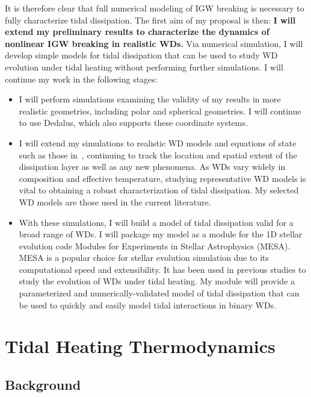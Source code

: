 \documentclass[12pt,
        usenames, %
        dvipsnames %
    ]{article}
\begin{document}
It is therefore clear that full numerical modeling of IGW breaking is necessary
to fully characterize tidal dissipation. The first aim of my proposal is then:
\textbf{I will extend my preliminary results to characterize the dynamics of
nonlinear IGW breaking in realistic WDs.} Via numerical simulation, I will
develop simple models for tidal dissipation that can be used to study WD
evolution under tidal heating without performing further simulations. I will
continue my work in the following stages:
\begin{itemize}
    \item I will perform simulations examining the validity of my results in
        more realistic geometries, including polar and spherical geometries. I
        will continue to use Dedalus, which also supports these coordinate
        systems.

    \item I will extend my simulations to realistic WD models and equations of
        state such as those in~\cite{brassard1992}, continuing to track the
        location and spatial extent of the dissipation layer as well as any new
        phenomena. As WDs vary widely in composition and effective temperature,
        studying representative WD models is vital to obtaining a robust
        characterization of tidal dissipation. My selected WD models are those
        used in the current literature\cite{fullerII, fullerIV}.

    \item With these simulations, I will build a model of tidal dissipation
        valid for a broad range of WDs. I will package my model as a module for
        the 1D stellar evolution code Modules for Experiments in Stellar
        Astrophysics (MESA)\cite{MESA}. MESA is a popular choice for stellar
        evolution simulation due to its computational speed and extensibility.
        It has been used in previous studies to study the evolution of WDs under
        tidal heating\cite{fullerIV,tidal_novae}. My module will provide a
        parameterized and numerically-validated model of tidal dissipation that
        can be used to quickly and easily model tidal interactions in binary
        WDs.
\end{itemize}

\section{Tidal Heating Thermodynamics}

\subsection{Background}
\end{document}
